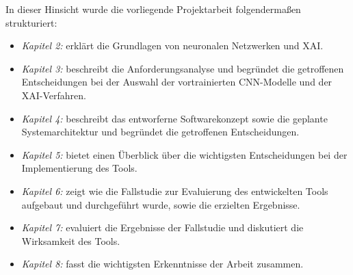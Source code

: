 In dieser Hinsicht wurde die vorliegende Projektarbeit folgendermaßen strukturiert:
\begin{itemize}
    \item \textit{Kapitel 2: } erklärt die Grundlagen von neuronalen Netzwerken und XAI.
    \item \textit{Kapitel 3: } beschreibt die Anforderungsanalyse und begründet die getroffenen Entscheidungen bei der Auswahl der vortrainierten CNN-Modelle und der XAI-Verfahren.
    \item \textit{Kapitel 4: } beschreibt das entworferne Softwarekonzept sowie die geplante Systemarchitektur und begründet die getroffenen Entscheidungen.
    \item \textit{Kapitel 5: } bietet einen Überblick über die wichtigsten Entscheidungen bei der Implementierung des Tools.
    \item \textit{Kapitel 6: } zeigt wie die Fallstudie zur Evaluierung des entwickelten Tools aufgebaut und durchgeführt wurde, sowie die erzielten Ergebnisse.
    \item \textit{Kapitel 7: } evaluiert die Ergebnisse der Fallstudie und diskutiert die Wirksamkeit des Tools.
    \item \textit{Kapitel 8: } fasst die wichtigsten Erkenntnisse der Arbeit zusammen.
\end{itemize}


